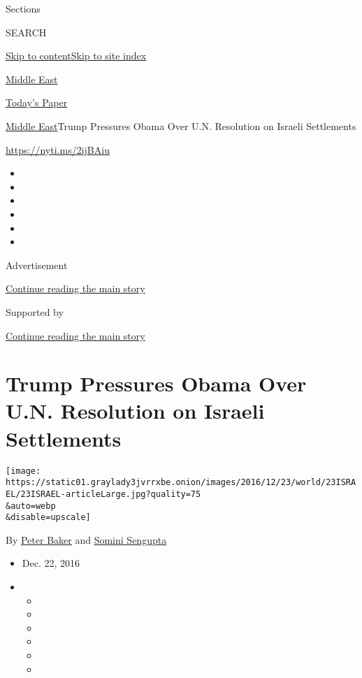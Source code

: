 Sections

SEARCH

\protect\hyperlink{site-content}{Skip to
content}\protect\hyperlink{site-index}{Skip to site index}

\href{https://www.nytimes3xbfgragh.onion/section/world/middleeast}{Middle
East}

\href{https://myaccount.nytimes3xbfgragh.onion/auth/login?response_type=cookie\&client_id=vi}{}

\href{https://www.nytimes3xbfgragh.onion/section/todayspaper}{Today's
Paper}

\href{/section/world/middleeast}{Middle East}\textbar{}Trump Pressures
Obama Over U.N. Resolution on Israeli Settlements

\url{https://nyti.ms/2ijBAiu}

\begin{itemize}
\item
\item
\item
\item
\item
\item
\end{itemize}

Advertisement

\protect\hyperlink{after-top}{Continue reading the main story}

Supported by

\protect\hyperlink{after-sponsor}{Continue reading the main story}

\hypertarget{trump-pressures-obama-over-un-resolution-on-israeli-settlements}{%
\section{Trump Pressures Obama Over U.N. Resolution on Israeli
Settlements}\label{trump-pressures-obama-over-un-resolution-on-israeli-settlements}}

\texttt{[image: https://static01.graylady3jvrrxbe.onion/images/2016/12/23/world/23ISRAEL/23ISRAEL-articleLarge.jpg?quality=75\\\&auto=webp\\\&disable=upscale]}

By \href{http://www.nytimes3xbfgragh.onion/by/peter-baker}{Peter Baker}
and \href{http://www.nytimes3xbfgragh.onion/by/somini-sengupta}{Somini
Sengupta}

\begin{itemize}
\item
  Dec. 22, 2016
\item
  \begin{itemize}
  \item
  \item
  \item
  \item
  \item
  \item
  \end{itemize}
\end{itemize}

